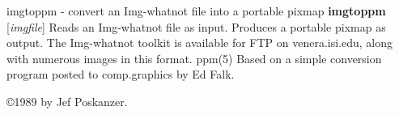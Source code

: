 %

\newpage
%

imgtoppm - convert an Img-whatnot file into a portable pixmap
{\bf imgtoppm}
{\rm [}{\it imgfile}{\rm ]}
Reads an Img-whatnot file as input.
Produces a portable pixmap as output.
The Img-whatnot toolkit is available for FTP on venera.isi.edu,
along with numerous images in this format.
ppm(5)
Based on a simple conversion program posted to comp.graphics by Ed Falk.

\copyright 1989 by Jef Poskanzer.
%
 
%

\newpage
%

